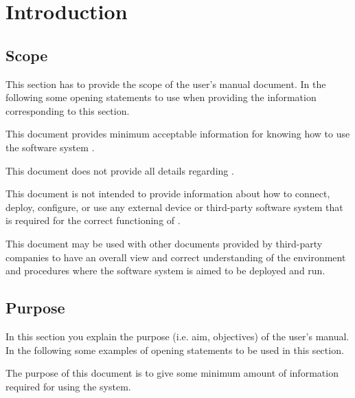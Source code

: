 \chapter{Introduction}
\label{chap:introduction}

\section{Scope}
This section has to provide the scope of the user's manual document.
In the following some opening statements to use when providing the
information corresponding to this section.

This document provides minimum acceptable information for knowing how to use the software system \mysystemname.


This document does not provide all details regarding \mysystemname.
 
This document is not intended to provide information about how to
 connect, deploy, configure, or use any external device or
 third-party software system that is required for the correct functioning of
 \mysystemname.

 
This document may be used with other documents provided by third-party
companies to have an overall view and correct understanding of the environment
and procedures where the software system \mysystemname is aimed to be deployed and run.




\section{Purpose}
In this section you explain the purpose (i.e. aim, objectives) of the user's
manual. In the following some examples of opening statements to be used in this
section.

The purpose of this document is to give some minimum amount of information
required for using the system.

